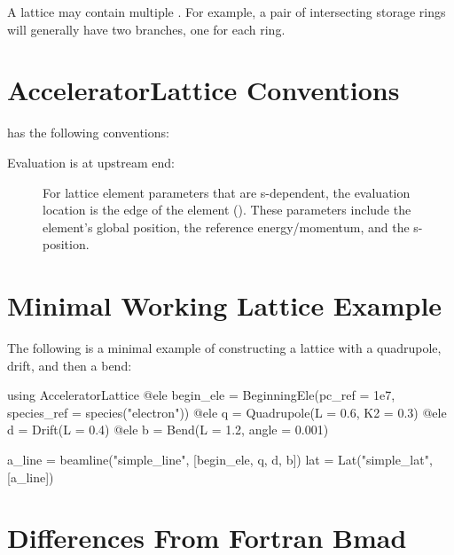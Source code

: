 A lattice may contain multiple  . For example, a pair of intersecting storage
rings will generally have two  branches, one for each ring.

\section{AcceleratorLattice Conventions}
\label{s:conventions}

\accellat has the following conventions:
\begin{description}
%
\item[Evaluation is at upstream end:] 
For lattice element parameters that are s-dependent, the evaluation location is the
 edge of the element (). These parameters include the 
element's global position, the reference energy/momentum, and the s-position.
%
\end{description}

\section{Minimal Working Lattice Example}
\label{s:min.lat}

The following is a minimal example of constructing a lattice with a quadrupole, drift, and then
a bend:
\begin{example}
  using AcceleratorLattice
  @ele begin_ele = BeginningEle(pc_ref = 1e7, species_ref = species("electron"))
  @ele q = Quadrupole(L = 0.6, K2 = 0.3)
  @ele d = Drift(L = 0.4)
  @ele b = Bend(L = 1.2, angle = 0.001)

  a_line = beamline("simple_line", [begin_ele, q, d, b])
  lat = Lat("simple_lat", [a_line])
\end{example}

\section{Differences From Fortran Bmad}

